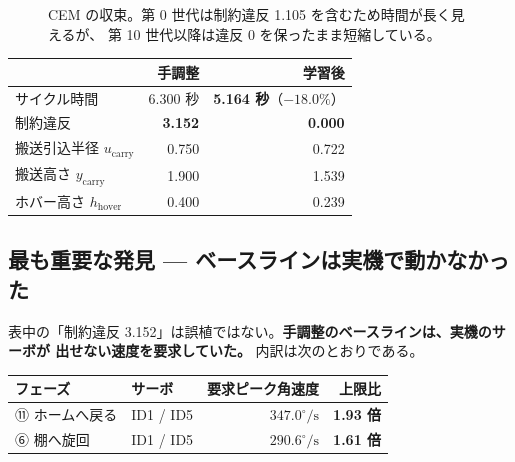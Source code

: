\documentclass[11pt,a4paper]{article}
\begin{document}
\begin{figure}[t]
\centering
{}
\caption{CEM の収束。第 0 世代は制約違反 1.105 を含むため時間が長く見えるが、
第 10 世代以降は違反 0 を保ったまま短縮している。}
\label{fig:rl}
\end{figure}

\begin{center}
\small
\begin{tabular}{@{}lrr@{}}
\toprule
 & \textbf{手調整} & \textbf{学習後} \\
\midrule
サイクル時間 & 6.300 秒 & \textbf{5.164 秒}（$-18.0\%$） \\
制約違反 & \textbf{3.152} & \textbf{0.000} \\
搬送引込半径 $u_{\text{carry}}$ & 0.750 & 0.722 \\
搬送高さ $y_{\text{carry}}$ & 1.900 & 1.539 \\
ホバー高さ $h_{\text{hover}}$ & 0.400 & 0.239 \\
\bottomrule
\end{tabular}
\end{center}

\subsection{最も重要な発見 --- ベースラインは実機で動かなかった}

表中の「制約違反 3.152」は誤植ではない。\textbf{手調整のベースラインは、実機のサーボが
出せない速度を要求していた。} 内訳は次のとおりである。

\begin{center}
\small
\begin{tabular}{@{}llrr@{}}
\toprule
フェーズ & サーボ & 要求ピーク角速度 & 上限比 \\
\midrule
⑪ ホームへ戻る & ID1 / ID5 & $347.0^\circ/\mathrm{s}$ & \textbf{1.93 倍} \\
⑥ 棚へ旋回 & ID1 / ID5 & $290.6^\circ/\mathrm{s}$ & \textbf{1.61 倍} \\
\bottomrule
\end{tabular}
\end{center}
\end{document}

